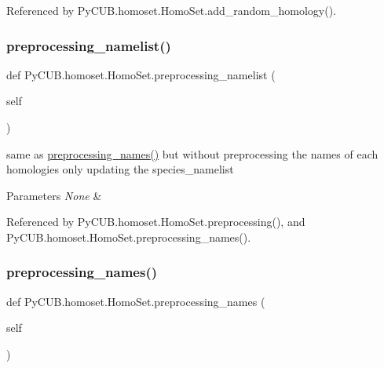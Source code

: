 Referenced by Py\+C\+U\+B.\+homoset.\+Homo\+Set.\+add\+\_\+random\+\_\+homology().

\mbox{\label{class_py_c_u_b_1_1homoset_1_1_homo_set_a4060c440127aa861c17b6157c81e2d27}} 
\subsubsection{\texorpdfstring{preprocessing\+\_\+namelist()}{preprocessing\_namelist()}}
{\footnotesize\ttfamily def Py\+C\+U\+B.\+homoset.\+Homo\+Set.\+preprocessing\+\_\+namelist (\begin{DoxyParamCaption}\item[{}]{self }\end{DoxyParamCaption})}



same as \mbox{\hyperlink{class_py_c_u_b_1_1homoset_1_1_homo_set_a36cf71a7bc24b788c4d526591a8ec376}{preprocessing\+\_\+names()}} but without preprocessing the names of each homologies only updating the species\+\_\+namelist 


\begin{DoxyParams}{Parameters}
{\em None} & \\
\hline
\end{DoxyParams}


Referenced by Py\+C\+U\+B.\+homoset.\+Homo\+Set.\+preprocessing(), and Py\+C\+U\+B.\+homoset.\+Homo\+Set.\+preprocessing\+\_\+names().

\mbox{\label{class_py_c_u_b_1_1homoset_1_1_homo_set_a36cf71a7bc24b788c4d526591a8ec376}} 
\subsubsection{\texorpdfstring{preprocessing\+\_\+names()}{preprocessing\_names()}}
{\footnotesize\ttfamily def Py\+C\+U\+B.\+homoset.\+Homo\+Set.\+preprocessing\+\_\+names (\begin{DoxyParamCaption}\item[{}]{self }\end{DoxyParamCaption})}



